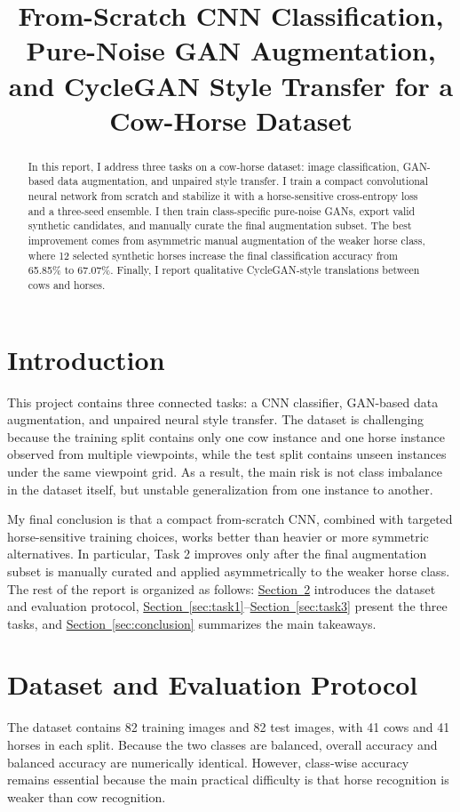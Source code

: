 \documentclass[conference]{IEEEtran}
\title{From-Scratch CNN Classification, Pure-Noise GAN Augmentation, and CycleGAN Style Transfer for a Cow-Horse Dataset}
\author{\IEEEauthorblockN{Qifeng LIU}}
\newcommand{\secref}[1]{\hyperref[#1]{Section~\ref*{#1}}}
\begin{document}
\maketitle

\begin{abstract}
In this report, I address three tasks on a cow-horse dataset: image classification, GAN-based data augmentation, and unpaired style transfer. I train a compact convolutional neural network from scratch and stabilize it with a horse-sensitive cross-entropy loss and a three-seed ensemble. I then train class-specific pure-noise GANs, export valid synthetic candidates, and manually curate the final augmentation subset. The best improvement comes from asymmetric manual augmentation of the weaker horse class, where 12 selected synthetic horses increase the final classification accuracy from 65.85\% to 67.07\%. Finally, I report qualitative CycleGAN-style translations between cows and horses.
\end{abstract}

\section{Introduction}\label{sec:intro}
This project contains three connected tasks: a CNN classifier, GAN-based data augmentation, and unpaired neural style transfer. The dataset is challenging because the training split contains only one cow instance and one horse instance observed from multiple viewpoints, while the test split contains unseen instances under the same viewpoint grid. As a result, the main risk is not class imbalance in the dataset itself, but unstable generalization from one instance to another.

My final conclusion is that a compact from-scratch CNN, combined with targeted horse-sensitive training choices, works better than heavier or more symmetric alternatives. In particular, Task 2 improves only after the final augmentation subset is manually curated and applied asymmetrically to the weaker horse class. The rest of the report is organized as follows: \secref{sec:data} introduces the dataset and evaluation protocol, \secref{sec:task1}--\secref{sec:task3} present the three tasks, and \secref{sec:conclusion} summarizes the main takeaways.

\section{Dataset and Evaluation Protocol}\label{sec:data}
The dataset contains 82 training images and 82 test images, with 41 cows and 41 horses in each split. Because the two classes are balanced, overall accuracy and balanced accuracy are numerically identical. However, class-wise accuracy remains essential because the main practical difficulty is that horse recognition is weaker than cow recognition.
\end{document}
